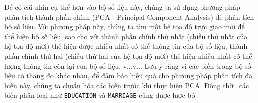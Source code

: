 Để có cái nhìn cụ thể hơn vào bộ số liệu này, chúng ta sử dụng phương pháp phân tích thành phần chính (PCA - Principal Component Analysis) để phân tích bộ số liệu.
Với phương pháp này, chúng ta tìm một hệ tọa độ trực giao mới để thể hiện bộ số liệu, sao cho với thành phần chính thứ nhất (chiều thứ nhất của hệ tọa độ mới) thể hiện được nhiều nhất có thể thông tin của bộ số liệu, thành phần chính thứ hai (chiều thứ hai của hệ tọa độ mới) thể hiện nhiều nhất có thể lượng thông tin còn lại của bộ số liệu, v...v... Lưu ý rằng vì các biến trong bộ số liệu có thang đo khác nhau, để đảm bảo hiệu quả cho phương pháp phân tích đa biến này, chúng ta chuẩn hóa các biến trước khi thực hiện PCA. Đồng thời, các biến phân loại như \texttt{EDUCATION} và \texttt{MARRIAGE} cũng được lược bỏ.

\begin{figure}[h]
\centering
\capstart
\begin{knitrout}
\color{fgcolor}\begin{kframe}
\begin{alltt}
 \hlkwb{<-} \hlstd{(}\hlstd{(}
                            \hlstd{(}\hlstd{),}
                            \hlstd{(}\hlstd{),}
                     \hlstd{)}
\end{alltt}


{\ttfamily\noindent\bfseries{}}\begin{alltt}
 \hlkwb{<-} \hlopt{$}\hlopt{^}\hlopt{/}\hlopt{$}\hlopt{^}\hlstd{)}\hlopt{*}
\end{alltt}



\end{kframe}
\end{knitrout}
\end{figure}
